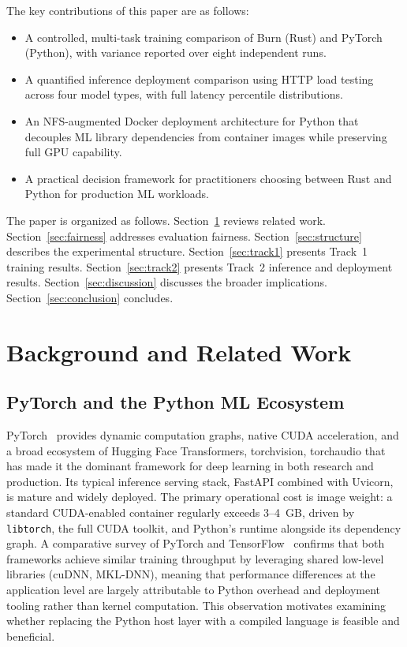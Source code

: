\documentclass{ieeeaccess}
\begin{document}
The key contributions of this paper are as follows:
\begin{itemize}
    \item A controlled, multi-task training comparison of Burn (Rust) and PyTorch (Python), with variance reported over eight independent runs.
    \item A quantified inference deployment comparison using HTTP load testing across four model types, with full latency percentile distributions.
    \item An NFS-augmented Docker deployment architecture for Python that decouples ML library dependencies from container images while preserving full GPU capability.
    \item A practical decision framework for practitioners choosing between Rust and Python for production ML workloads.
\end{itemize}

The paper is organized as follows. Section~\ref{sec:related} reviews related work. Section~\ref{sec:fairness} addresses evaluation fairness. Section~\ref{sec:structure} describes the experimental structure. Section~\ref{sec:track1} presents Track~1 training results. Section~\ref{sec:track2} presents Track~2 inference and deployment results. Section~\ref{sec:discussion} discusses the broader implications. Section~\ref{sec:conclusion} concludes.

\section{Background and Related Work}
\label{sec:related}

\subsection{PyTorch and the Python ML Ecosystem}

PyTorch~\cite{paszke2019pytorch} provides dynamic computation graphs, native CUDA acceleration, and a broad ecosystem of Hugging Face Transformers, torchvision, torchaudio that has made it the dominant framework for deep learning in both research and production. Its typical inference serving stack, FastAPI combined with Uvicorn, is mature and widely deployed. The primary operational cost is image weight: a standard CUDA-enabled container regularly exceeds 3--4~GB, driven by \texttt{libtorch}, the full CUDA toolkit, and Python's runtime alongside its dependency graph. A comparative survey of PyTorch and TensorFlow~\cite{pytorchvstf2025} confirms that both frameworks achieve similar training throughput by leveraging shared low-level libraries (cuDNN, MKL-DNN), meaning that performance differences at the application level are largely attributable to Python overhead and deployment tooling rather than kernel computation. This observation motivates examining whether replacing the Python host layer with a compiled language is feasible and beneficial.
\end{document}
